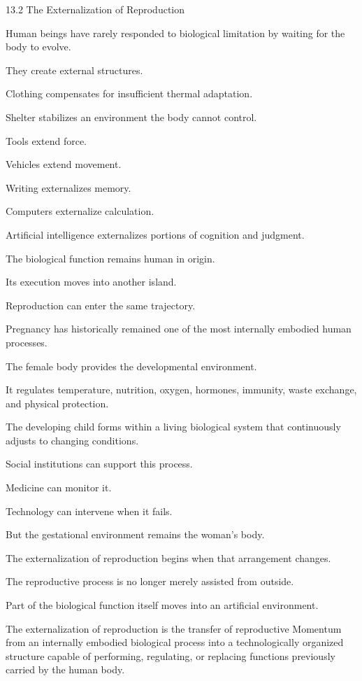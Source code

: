 13.2 The Externalization of Reproduction

Human beings have rarely responded to biological limitation by waiting for the body to evolve.

They create external structures.

Clothing compensates for insufficient thermal adaptation.

Shelter stabilizes an environment the body cannot control.

Tools extend force.

Vehicles extend movement.

Writing externalizes memory.

Computers externalize calculation.

Artificial intelligence externalizes portions of cognition and judgment.

The biological function remains human in origin.

Its execution moves into another island.

Reproduction can enter the same trajectory.

Pregnancy has historically remained one of the most internally embodied human processes.

The female body provides the developmental environment.

It regulates temperature, nutrition, oxygen, hormones, immunity, waste exchange, and physical protection.

The developing child forms within a living biological system that continuously adjusts to changing conditions.

Social institutions can support this process.

Medicine can monitor it.

Technology can intervene when it fails.

But the gestational environment remains the woman’s body.

The externalization of reproduction begins when that arrangement changes.

The reproductive process is no longer merely assisted from outside.

Part of the biological function itself moves into an artificial environment.

The externalization of reproduction is the transfer of reproductive Momentum from an internally embodied biological process into a technologically organized structure capable of performing, regulating, or replacing functions previously carried by the human body.

